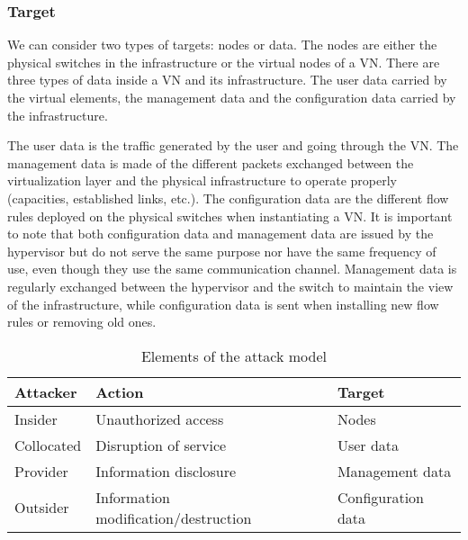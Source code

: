 \subsubsection{Target}
We can consider two types of targets: nodes or data.
The nodes are either the physical switches in the infrastructure or the virtual nodes of a VN.
There are three types of data inside a VN and its infrastructure.
The user data carried by the virtual elements, the management data and the configuration data carried by the infrastructure. 

The user data is the traffic generated by the user and going through the VN.
The management data is made of the different packets exchanged between the virtualization layer and the physical infrastructure to operate properly (capacities, established links, etc.).
The configuration data are the different flow rules deployed on the physical switches when instantiating a VN.
It is important to note that both configuration data and management data are issued by the hypervisor but do not serve the same purpose nor have the same frequency of use, even though they use the same communication channel.
Management data is regularly exchanged between the hypervisor and the switch to maintain the view of the infrastructure, while configuration data is sent when installing new flow rules or removing old ones.

\begin{table}[h]
\centering
\begin{tabular}{|l|l|l|}
\hline
\textbf{Attacker}   & \textbf{Action}    & \textbf{Target}             \\ \hline
Insider    & Unauthorized access                  & Nodes              \\ \hline
Collocated & Disruption of service                & User data          \\ \hline
Provider   & Information disclosure               & Management data    \\ \hline
Outsider   & Information modification/destruction & Configuration data \\ \hline
\end{tabular}
\caption{Elements of the attack model}
\label{tab:attack-model}
\end{table}

